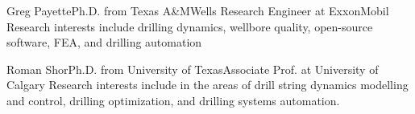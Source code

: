 \begin{committeemember}{Greg Payette}{Ph.D. from Texas A\&M}{Wells Research Engineer at ExxonMobil}
Research interests include drilling dynamics, wellbore quality, open-source software, FEA, and drilling automation
\end{committeemember}

\begin{committeemember}{Roman Shor}{Ph.D. from University of Texas}{Associate Prof. at University of Calgary}
Research interests include in the areas of drill string dynamics modelling and control, drilling optimization, and drilling systems automation.
\end{committeemember}





